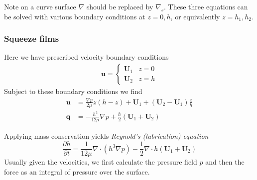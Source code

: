 \documentclass{jknotes}
\begin{document}
Note on a curve surface $\nabla$ should be replaced by $\nabla_s$. These three
equations can be solved with various boundary conditions at $z=0,h$, or
equivalently $z=h_1, h_2$.

\subsubsection{Squeeze films}
Here we have prescribed velocity boundary conditions
\begin{align}
	\symbf{u} = \begin{cases} \symbf{U}_1 & z=0 \\ \symbf{U}_2 & z=h
	\end{cases}
\end{align}
Subject to these boundary conditions we find
\begin{align}
	\symbf{u} &= \frac{\nabla p}{2\mu} z(h-z) + \symbf{U}_1 +
	(\symbf{U}_2-\symbf{U}_1) \frac{z}{h}\\
	\symbf{q} &= -\frac{h^3}{12\mu}\nabla p +
	\frac{h}{2}(\symbf{U}_1+\symbf{U}_2)
\end{align}

Applying mass conservation yields \emph{Reynold's (lubrication) equation}
\begin{equation}
	\frac{\partial h}{\partial t} = \frac{1}{12\mu} \nabla \cdot (h^3 \nabla
	p) - \frac{1}{2} \nabla \cdot h(\symbf{U}_1+\symbf{U}_2)
\end{equation}
Usually given the velocities, we first calculate the pressure field $p$ and
then the force as an integral of pressure over the surface.
\end{document}

